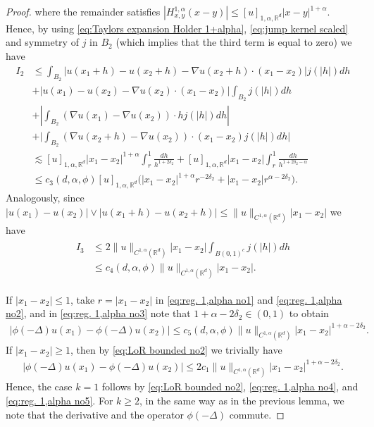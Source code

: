\documentclass[12pt,a4paper,onecolumn]{amsart}
\theoremstyle{definition}
\newcommand{\R}{\mathbb{R}}
\newcommand{\1}{\mathbf 1}
\newcommand{\LoR}{\phi(-\Delta)}
\numberwithin{equation}{section}
\begin{document}
\begin{proof}
where the remainder satisfies $|H^{1,\alpha}_{x,y}({x-y})|\le [u]_{1,\alpha,\R^d}|{x-y}|^{1+\alpha}$. Hence, by using \eqref{eq:Taylors expansion Holder 1+alpha}, \eqref{eq:jump kernel scaled} and symmetry of $j$ in $B_2$ (which implies that the third term is equal to zero) we have
\begin{align}
    I_2&\le\int_{B_2}\big|u(x_1+h)-u(x_2+h)-\nabla u(x_2+h)\cdot ({x_1-x_2})|j(|h|)dh\nonumber\\
    &+|u(x_1)-u(x_2)-\nabla u(x_2)\cdot ({x_1-x_2})|\int_{B_2}j(|h|)dh\nonumber\\
    &+\left|\int_{B_2}(\nabla u(x_1)-\nabla u(x_2))\cdot hj(|h|)dh\right|\nonumber\\
    &+\big|\int_{B_2}(\nabla u(x_2+h)-\nabla u(x_2))\cdot ({x_1-x_2})j(|h|)dh\big|\nonumber\\
    &\lesssim [u]_{1,\alpha,\R^d}|{x_1-x_2}|^{1+\alpha}\int_r^1\frac{dh}{h^{1+2\delta_2}}+[u]_{1,\alpha,\R^d}|{x_1-x_2}|\int_r^1\frac{dh}{h^{1+2\delta_2-\alpha}}\nonumber\\
    &\le c_3(d,\alpha,\phi)[u]_{1,\alpha,\R^d}\big(|{x_1-x_2}|^{1+\alpha}r^{-2\delta_2}+|{x_1-x_2}|r^{\alpha-2\delta_2}\big).\label{eq:reg. 1,alpha no2}
\end{align}
Analogously, since $|u(x_1)-u(x_2)|\vee |u(x_1+h)-u(x_2+h)|\le \|u\|_{C^{1,\alpha}(\R^d)}|x_1-x_2|$ we have
\begin{align}
\begin{split}\label{eq:reg. 1,alpha no3}
    I_3&\le 2\|u\|_{C^{1,\alpha}(\R^d)}|x_1-x_2|\int_{B(0,1)^c}j(|h|)dh\\&\le c_4(d,\alpha,\phi)\|u\|_{C^{1,\alpha}(\R^d)}|x_1-x_2|.
\end{split}
\end{align}

If $|x_1-x_2|\le 1$, take $r=|x_1-x_2|$ in \eqref{eq:reg. 1,alpha no1} and \eqref{eq:reg. 1,alpha no2}, and in \eqref{eq:reg. 1,alpha no3} note that $1+\alpha-2\delta_2\in(0,1)$ to obtain
\begin{align}\label{eq:reg. 1,alpha no4}
    |\LoR u(x_1)-\LoR u(x_2)|\le c_5(d,\alpha,\phi)\|u\|_{C^{1,\alpha}(\R^d)}|x_1-x_2|^{1+\alpha-2\delta_2}.
\end{align}
If $|x_1-x_2|\ge 1$, then by \eqref{eq:LoR bounded no2} we trivially have
\begin{align}\label{eq:reg. 1,alpha no5}
|\LoR u(x_1)-\LoR u(x_2)|\le  2c_1\|u\|_{C^{1,\alpha}(\R^d)}|x_1-x_2|^{1+\alpha-2\delta_2}.
    \end{align}
Hence, the case $k=1$ follows by \eqref{eq:LoR bounded no2}, \eqref{eq:reg. 1,alpha no4}, and \eqref{eq:reg. 1,alpha no5}. For $k\ge 2$, in the same way as in the previous lemma, we note that the derivative and the operator $\LoR$ commute.
\end{proof}
\end{document}
